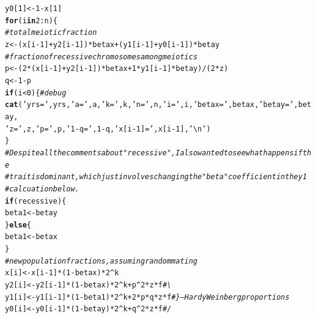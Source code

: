 \documentclass{article}\usepackage[]{graphicx}\usepackage[]{color}
\makeatletter
\newcommand{\hlnum}[1]{\textcolor[rgb]{0.686,0.059,0.569}{#1}}%
\newcommand{\hlstr}[1]{\textcolor[rgb]{0.192,0.494,0.8}{#1}}%
\newcommand{\hlcom}[1]{\textcolor[rgb]{0.678,0.584,0.686}{\textit{#1}}}%
\newcommand{\hlopt}[1]{\textcolor[rgb]{0,0,0}{#1}}%
\newcommand{\hlstd}[1]{\textcolor[rgb]{0.345,0.345,0.345}{#1}}%
\newcommand{\hlkwa}[1]{\textcolor[rgb]{0.161,0.373,0.58}{\textbf{#1}}}%
\newcommand{\hlkwb}[1]{\textcolor[rgb]{0.69,0.353,0.396}{#1}}%
\newcommand{\hlkwd}[1]{\textcolor[rgb]{0.737,0.353,0.396}{\textbf{#1}}}%
\newenvironment{kframe}{%
 \def\at@end@of@kframe{}%
 \ifinner\ifhmode%
  \def\at@end@of@kframe{\end{minipage}}%
  \begin{minipage}{\columnwidth}%
 \fi\fi%
 \def\FrameCommand##1{\hskip\@totalleftmargin \hskip-\fboxsep
 \colorbox{shadecolor}{##1}\hskip-\fboxsep
     \hskip-\linewidth \hskip-\@totalleftmargin \hskip\columnwidth}%
 \MakeFramed {\advance\hsize-\width
   \@totalleftmargin\z@ \linewidth\hsize
   \@setminipage}}%
 {\par\unskip\endMakeFramed%
 \at@end@of@kframe}
\newenvironment{knitrout}{}{} %
\makeatother
\begin{document}
\begin{knitrout}
\begin{kframe}
\begin{alltt}
  \hlstd{y0[}\hlnum{1}\hlstd{]} \hlkwb{<-} \hlnum{1}\hlopt{-}\hlstd{x[}\hlnum{1}\hlstd{]}
  \hlkwa{for}\hlstd{(i} \hlkwa{in} \hlnum{2}\hlopt{:}\hlstd{n)\{}
    \hlcom{# total meiotic fraction}
    \hlstd{z} \hlkwb{<-} \hlstd{(x[i}\hlopt{-}\hlnum{1}\hlstd{]}\hlopt{+}\hlstd{y2[i}\hlopt{-}\hlnum{1}\hlstd{])}\hlopt{*}\hlstd{betax} \hlopt{+} \hlstd{(y1[i}\hlopt{-}\hlnum{1}\hlstd{]}\hlopt{+}\hlstd{y0[i}\hlopt{-}\hlnum{1}\hlstd{])}\hlopt{*}\hlstd{betay}
    \hlcom{# fraction of recessive chromosomes among meiotics}
    \hlstd{p} \hlkwb{<-} \hlstd{(}\hlnum{2}\hlopt{*}\hlstd{(x[i}\hlopt{-}\hlnum{1}\hlstd{]}\hlopt{+}\hlstd{y2[i}\hlopt{-}\hlnum{1}\hlstd{])}\hlopt{*}\hlstd{betax} \hlopt{+} \hlnum{1}\hlopt{*}\hlstd{y1[i}\hlopt{-}\hlnum{1}\hlstd{]}\hlopt{*}\hlstd{betay)}\hlopt{/}\hlstd{(}\hlnum{2}\hlopt{*}\hlstd{z)}
    \hlstd{q} \hlkwb{<-} \hlnum{1}\hlopt{-}\hlstd{p}
    \hlkwa{if}\hlstd{(i}\hlopt{<}\hlnum{0}\hlstd{)\{} \hlcom{# debug}
      \hlkwd{cat}\hlstd{(}\hlstr{'yrs='}\hlstd{,yrs,}\hlstr{'a='}\hlstd{,a,}\hlstr{'k='}\hlstd{,k,}\hlstr{'n='}\hlstd{,n,}\hlstr{'i='}\hlstd{,i,}\hlstr{'betax='}\hlstd{,betax,}\hlstr{'betay='}\hlstd{,betay,}
          \hlstr{'z='}\hlstd{,z,}\hlstr{'p='}\hlstd{,p,} \hlstr{'1-q='}\hlstd{,}\hlnum{1}\hlopt{-}\hlstd{q,}\hlstr{'x[i-1]='}\hlstd{,x[i}\hlopt{-}\hlnum{1}\hlstd{],}\hlstr{'\textbackslash{}n'}\hlstd{)}
    \hlstd{\}}
    \hlcom{# Despite all the comments about "recessive", I also wanted to see what happens if the}
    \hlcom{# trait is dominant, which just involves changing the "beta" coefficient in the y1}
    \hlcom{# calcuation below.}
    \hlkwa{if}\hlstd{(recessive)\{}
      \hlstd{beta1} \hlkwb{<-} \hlstd{betay}
    \hlstd{\}} \hlkwa{else} \hlstd{\{}
      \hlstd{beta1} \hlkwb{<-} \hlstd{betax}
    \hlstd{\}}
    \hlcom{# new population fractions, assuming random mating}
    \hlstd{x[i]}  \hlkwb{<-}  \hlstd{x[i}\hlopt{-}\hlnum{1}\hlstd{]}\hlopt{*}\hlstd{(}\hlnum{1}\hlopt{-}\hlstd{betax)}\hlopt{*}\hlnum{2}\hlopt{^}\hlstd{k}
    \hlstd{y2[i]} \hlkwb{<-} \hlstd{y2[i}\hlopt{-}\hlnum{1}\hlstd{]}\hlopt{*}\hlstd{(}\hlnum{1}\hlopt{-}\hlstd{betax)}\hlopt{*}\hlnum{2}\hlopt{^}\hlstd{k} \hlopt{+}   \hlstd{p}\hlopt{^}\hlnum{2} \hlopt{*} \hlstd{z} \hlopt{*} \hlstd{f} \hlcom{# \textbackslash{}}
    \hlstd{y1[i]} \hlkwb{<-} \hlstd{y1[i}\hlopt{-}\hlnum{1}\hlstd{]}\hlopt{*}\hlstd{(}\hlnum{1}\hlopt{-}\hlstd{beta1)}\hlopt{*}\hlnum{2}\hlopt{^}\hlstd{k} \hlopt{+} \hlnum{2}\hlopt{*}\hlstd{p}\hlopt{*}\hlstd{q} \hlopt{*} \hlstd{z} \hlopt{*} \hlstd{f} \hlcom{#  \}-- Hardy Weinberg proportions }
    \hlstd{y0[i]} \hlkwb{<-} \hlstd{y0[i}\hlopt{-}\hlnum{1}\hlstd{]}\hlopt{*}\hlstd{(}\hlnum{1}\hlopt{-}\hlstd{betay)}\hlopt{*}\hlnum{2}\hlopt{^}\hlstd{k} \hlopt{+}   \hlstd{q}\hlopt{^}\hlnum{2} \hlopt{*} \hlstd{z} \hlopt{*} \hlstd{f} \hlcom{# /}

\end{alltt}
\end{kframe}
\end{knitrout}
\end{document}
